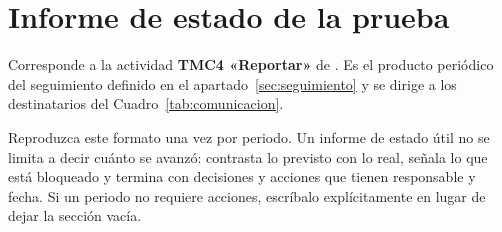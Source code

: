 \section{Informe de estado de la prueba}
\label{anx:informes}

\begin{notanormativa}
Corresponde a la actividad \textbf{TMC4 «Reportar»} de . Es el producto periódico del
seguimiento definido en el apartado~\ref{sec:seguimiento} y se dirige a los destinatarios del
Cuadro~\ref{tab:comunicacion}.
\end{notanormativa}

\begin{observacion}
\end{observacion}

\begin{instruccion}
Reproduzca este formato una vez por periodo. Un informe de estado útil no se limita a decir
cuánto se avanzó: contrasta lo previsto con lo real, señala lo que está bloqueado y termina con
decisiones y acciones que tienen responsable y fecha. Si un periodo no requiere acciones,
escríbalo explícitamente en lugar de dejar la sección vacía.
\end{instruccion}

